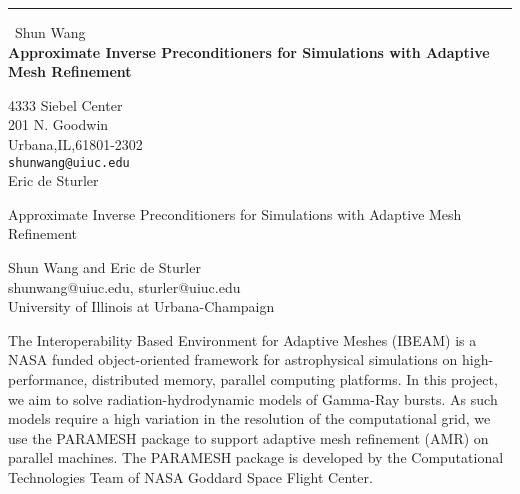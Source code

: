 \documentclass{report}
\begin{document}
\begin{center}
\rule{6in}{1pt} \
{\large Shun Wang \\
{\bf Approximate Inverse Preconditioners for Simulations with Adaptive Mesh Refinement}}

4333 Siebel Center \\ 201 N. Goodwin \\ Urbana,IL,61801-2302
\\
{\tt shunwang@uiuc.edu}\\
Eric de Sturler\end{center}

\begin{center}
Approximate Inverse Preconditioners for Simulations with Adaptive Mesh Refinement\\
\bigskip

Shun Wang and Eric de Sturler\\
shunwang@uiuc.edu, sturler@uiuc.edu\\
University of Illinois at Urbana-Champaign\\
\end{center}
\bigskip

The Interoperability Based Environment for Adaptive Meshes (IBEAM) is a
NASA funded object-oriented framework for astrophysical simulations on
high-performance, distributed memory, parallel computing platforms. In
this project, we aim to solve radiation-hydrodynamic models of Gamma-Ray
bursts. As such models require a high variation in the resolution of the
computational grid, we use the PARAMESH package to support adaptive mesh
refinement (AMR) on parallel machines. The PARAMESH package is developed
by the Computational Technologies
Team of NASA Goddard Space Flight Center.\\
\end{document}

